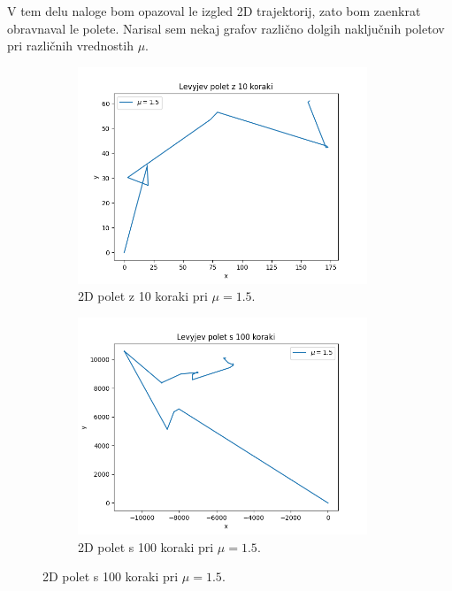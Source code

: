 \documentclass[a4paper, 12pt, slovene]{article}
\begin{document}
V tem delu naloge bom opazoval le izgled 2D trajektorij, zato bom zaenkrat obravnaval le polete. Narisal sem nekaj grafov različno dolgih naključnih poletov pri različnih vrednostih $\mu$.

\begin{figure}[H]
\centering
\begin{subfigure}{0.49\textwidth}
	\centering
	\includegraphics[width=0.95\textwidth]{sprehodi/let-10-1.5.png}
	\caption{2D polet z 10 koraki pri $\mu = 1.5$.}
	\label{fig-let-10-1.5}
\end{subfigure}
\begin{subfigure}{0.49\textwidth}
	\centering
	\includegraphics[width=0.95\textwidth]{sprehodi/let-100-1.5.png}
	\caption{2D polet s 100 koraki pri $\mu = 1.5$.}
	\label{fig-let-100-1.5}
\end{subfigure}

\end{figure}
\end{document}
